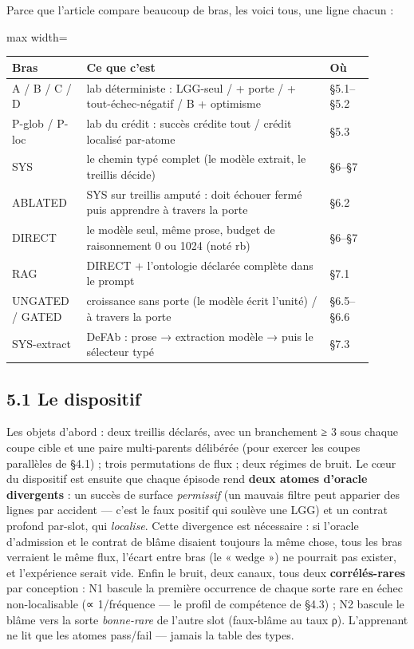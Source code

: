 \documentclass[11pt]{article}
\begin{document}
Parce que l'article compare beaucoup de bras, les voici tous, une ligne chacun :

\begin{center}\small\begin{adjustbox}{max width=\linewidth}\begin{tabular}{>{\raggedright\arraybackslash}p{0.174\linewidth}>{\raggedright\arraybackslash}p{0.615\linewidth}>{\raggedright\arraybackslash}p{0.113\linewidth}}\toprule
Bras & Ce que c'est & Où \\ \midrule
A / B / C / D & lab déterministe : LGG-seul / + porte / + tout-échec-négatif / B + optimisme & §5.1–§5.2 \\
P-glob / P-loc & lab du crédit : succès crédite tout / crédit localisé par-atome & §5.3 \\
SYS & le chemin typé complet (le modèle extrait, le treillis décide) & §6–§7 \\
ABLATED & SYS sur treillis amputé : doit échouer fermé puis apprendre à travers la porte & §6.2 \\
DIRECT & le modèle seul, même prose, budget de raisonnement 0 ou 1024 (noté rb) & §6–§7 \\
RAG & DIRECT + l'ontologie déclarée complète dans le prompt & §7.1 \\
UNGATED / GATED & croissance sans porte (le modèle écrit l'unité) / à travers la porte & §6.5–§6.6 \\
SYS-extract & DeFAb : prose → extraction modèle → puis le sélecteur typé & §7.3 \\
\bottomrule\end{tabular}\end{adjustbox}\end{center}

\subsection*{5.1 Le dispositif}

Les objets d'abord : deux treillis déclarés, avec un branchement ≥ 3 sous chaque coupe cible et une paire multi-parents délibérée (pour exercer les coupes parallèles de §4.1) ; trois permutations de flux ; deux régimes de bruit. Le cœur du dispositif est ensuite que chaque épisode rend \textbf{deux atomes d'oracle divergents} : un succès de surface \emph{permissif} (un mauvais filtre peut apparier des lignes par accident — c'est le faux positif qui soulève une LGG) et un contrat profond par-slot, qui \emph{localise}. Cette divergence est nécessaire : si l'oracle d'admission et le contrat de blâme disaient toujours la même chose, tous les bras verraient le même flux, l'écart entre bras (le « wedge ») ne pourrait pas exister, et l'expérience serait vide. Enfin le bruit, deux canaux, tous deux \textbf{corrélés-rares} par conception : N1 bascule la première occurrence de chaque sorte rare en échec non-localisable (∝ 1/fréquence — le profil de compétence de §4.3) ; N2 bascule le blâme vers la sorte \emph{bonne-rare} de l'autre slot (faux-blâme au taux ρ). L'apprenant ne lit que les atomes pass/fail — jamais la table des types.
\end{document}
